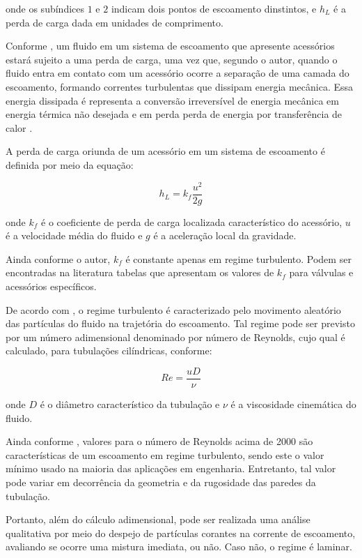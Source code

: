 onde os subíndices $1$ e $2$ indicam dois pontos de escoamento dinstintos, e $h_L$ é
a perda de carga dada em unidades de comprimento.

Conforme , um fluido em um sistema de 
escoamento que apresente 
acessórios estará sujeito a uma perda de
carga, uma vez que, segundo o autor, quando o fluido entra em contato com 
um acessório ocorre a separação de uma camada
do escoamento, formando correntes turbulentas que dissipam energia mecânica. 
Essa energia dissipada é representa a conversão irreversível de energia mecânica 
em energia térmica não desejada e em perda perda de energia por transferência de 
calor .


A perda de carga oriunda de um acessório em um sistema de escoamento é definida por meio da equação:

\begin{equation}
    h_L = k_f \frac{u^2}{2g}
\end{equation}

onde $k_f$ é o coeficiente de perda de carga localizada característico do acessório, 
$u$ é a velocidade média do fluido e $g$ é a aceleração local da gravidade. 

Ainda conforme o autor, $k_f$ é constante apenas em regime turbulento. Podem ser 
encontradas na literatura tabelas que apresentam os valores de $k_f$ para válvulas
e acessórios específicos.

De acordo com , o regime turbulento é caracterizado 
pelo movimento
aleatório das partículas do fluido na
trajetória do escoamento. Tal regime pode ser previsto por um número 
adimensional denominado por número de Reynolds,
cujo qual é calculado, para tubulações cilíndricas, conforme:

\begin{equation}
    Re = \frac{u D}{\nu}
\end{equation}
 
onde $D$ é o diâmetro característico da tubulação e $\nu$ é a viscosidade 
cinemática do fluido.

Ainda conforme , valores para o número de 
Reynolds acima de 2000 são 
características de um escoamento em regime
turbulento, sendo este o valor mínimo usado na maioria das aplicações em engenharia.
Entretanto, tal valor pode variar em decorrência da geometria e da 
rugosidade das paredes da tubulação.

Portanto, além do cálculo adimensional, pode ser realizada uma análise 
qualitativa por meio do despejo de partículas
corantes na corrente de escoamento, avaliando se ocorre uma mistura imediata, ou 
não. Caso não, o regime é laminar.

